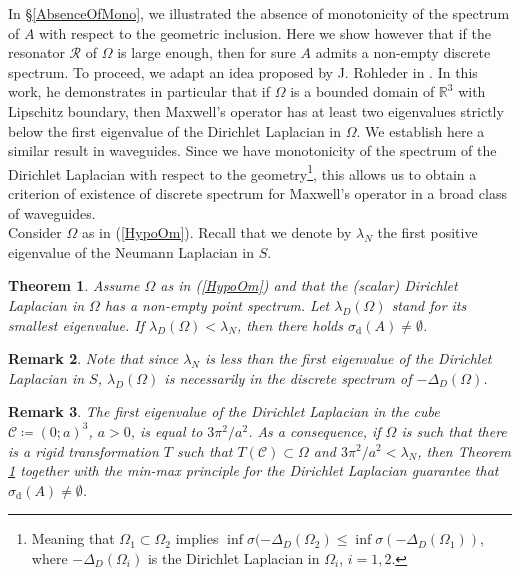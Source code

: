 \documentclass[11pt,a4paper]{article}
\newcommand{\Om}{\Omega}
\newcommand{\mrm}[1]{\mathrm{#1}}
\newcommand{\R}{\mathbb{R}}
\newtheorem{theorem}{Theorem}[section]
\newtheorem{remark}[theorem]{Remark}
\begin{document}
In \S\ref{AbsenceOfMono}, we illustrated the absence of monotonicity of the spectrum of $A$ with respect to the geometric inclusion. Here we show however that if the resonator $\mathcal{R}$ of $\Om$ is large enough, then for sure $A$ admits a non-empty discrete spectrum. To proceed, we adapt an idea proposed by J. Rohleder in \cite{Rohl24}. In this work, he demonstrates in particular that if $\Om$ is a bounded domain of $\R^3$ with Lipschitz boundary, then Maxwell's operator has at least two eigenvalues strictly below the first eigenvalue of the Dirichlet Laplacian in $\Om$. We establish here a similar result in waveguides. Since we have monotonicity of the spectrum of the Dirichlet Laplacian with respect to the geometry\footnote{Meaning that $\Om_1\subset\Om_2$ implies $\inf \sigma(-\Delta_D(\Om_2) \le \inf \sigma(-\Delta_D(\Om_1))$, where $-\Delta_D(\Om_i)$ is the Dirichlet Laplacian in $\Om_i$, $i=1,2$.}, this allows us to obtain a criterion of existence of discrete spectrum for Maxwell's operator in a broad class of waveguides.\\
\newline 
Consider $\Om$ as in (\ref{HypoOm}). Recall that we denote by $\lambda_N$ the first positive eigenvalue of the Neumann Laplacian in $S$.
\begin{theorem}\label{ThmBigRes}
Assume $\Om$ as in (\ref{HypoOm}) and that the (scalar) Dirichlet Laplacian in $\Om$ has a non-empty point spectrum. Let $\lambda_D(\Om)$ stand for its smallest eigenvalue. If $\lambda_D(\Om)<\lambda_N$, then there holds $\sigma_{\mrm{d}}(A)\ne\emptyset$.
\end{theorem}
\begin{remark}
Note that since $\lambda_N$ is less than the first eigenvalue of the Dirichlet Laplacian in $S$, $\lambda_D(\Om)$ is necessarily in the discrete spectrum of $-\Delta_D(\Om)$.
\end{remark}
\begin{remark}
The first eigenvalue of the Dirichlet Laplacian in the cube $\mathcal{C}\coloneqq(0;a)^3$, $a>0$, is equal to $3\pi^2/a^2$. As a consequence, if $\Om$ is such that there is a rigid transformation $T$ such that $T(\mathcal{C})\subset\Om$ and $3\pi^2/a^2<\lambda_N$, then Theorem \ref{ThmBigRes} together with the min-max principle for the Dirichlet Laplacian guarantee that $\sigma_{\mrm{d}}(A)\ne\emptyset$.
\end{remark}
\end{document}
